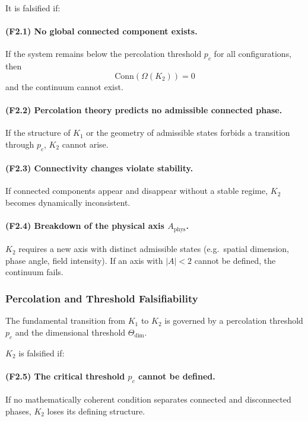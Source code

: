 It is falsified if:

\paragraph{(F2.1) No global connected component exists.}
If the system remains below the percolation threshold $p_c$ for all
configurations, then
\[
\mathrm{Conn}(\Omega(K_2)) = 0
\]
and the continuum cannot exist.

\paragraph{(F2.2) Percolation theory predicts no admissible connected
phase.}
If the structure of $K_1$ or the geometry of admissible states forbids a
transition through $p_c$, $K_2$ cannot arise.

\paragraph{(F2.3) Connectivity changes violate stability.}
If connected components appear and disappear without a stable regime,
$K_2$ becomes dynamically inconsistent.

\paragraph{(F2.4) Breakdown of the physical axis $A_{\mathrm{phys}}$.}
$K_2$ requires a new axis with distinct admissible states (e.g.~spatial
dimension, phase angle, field intensity).
If an axis with $|A|<2$ cannot be defined, the continuum fails.



\subsubsection{Percolation and Threshold Falsifiability}

The fundamental transition from $K_1$ to $K_2$ is governed by a
percolation threshold $p_c$ and the dimensional threshold
$\Theta_{\mathrm{dim}}$.

$K_2$ is falsified if:

\paragraph{(F2.5) The critical threshold \texorpdfstring{$p_c$}{p_c} cannot be defined.}
If no mathematically coherent condition separates connected and
disconnected phases, $K_2$ loses its defining structure.

